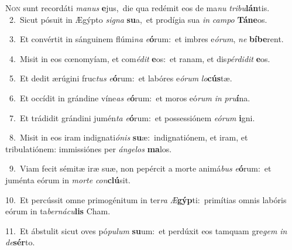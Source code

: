 \lettrine{\initial\textcolor{\initialcolor}{N}}{on} sunt recordáti \textit{ma}\-\textit{nus} \textbf{e}\-jus,~\star die qua redémit eos de ma\textit{nu} \textit{tri}\-\textit{bu}\textbf{lán}tis.\\
{\numbfont\textcolor{\numbcolor}{~2.}}~Sicut pósuit in Ægýpto \textit{si}\-\textit{gna} \textbf{su}\-a,~\star et prodígia sua \textit{in} \textit{cam}\-\textit{po} \textbf{Tá}\-\textbf{ne}os.\par
{\numbfont\textcolor{\numbcolor}{~3.}}~Et convértit in sánguinem flúmi\textit{na} \textit{e}\-\textbf{ó}rum:~\star et imbres e\-\textit{ó}\-\textit{rum}, \textit{ne} \textbf{bí}\-\textbf{be}rent.\par
{\numbfont\textcolor{\numbcolor}{~4.}}~Misit in eos cœnomyíam, et com\-\textit{é}\-\textit{dit} \textbf{e}\-os:~\star et ranam, et dis\-\textit{pér}\-\textit{di}\textit{dit} \textbf{e}\-os.\par
{\numbfont\textcolor{\numbcolor}{~5.}}~Et dedit ærúgini fruc\textit{tus} \textit{e}\-\textbf{ó}rum:~\star et labóres e\-\textit{ó}\-\textit{rum} \textit{lo}\-\textbf{cús}tæ.\par
{\numbfont\textcolor{\numbcolor}{~6.}}~Et occídit in grándine víne\textit{as} \textit{e}\-\textbf{ó}rum:~\star et moros eó\textit{rum} \textit{in} \textit{pru}\-\textbf{í}na.\par
{\numbfont\textcolor{\numbcolor}{~7.}}~Et trádidit grándini jumén\textit{ta} \textit{e}\-\textbf{ó}rum:~\star et possessiónem \textit{e}\-\textit{ó}\textit{rum} \textbf{i}\-gni.\par
{\numbfont\textcolor{\numbcolor}{~8.}}~Misit in eos iram indignati\-\textit{ó}\-\textit{nis} \textbf{su}\-æ:~\star indignatiónem, et iram, et tribulatiónem: immissiónes per \textit{án}\-\textit{ge}\textit{los} \textbf{ma}\-los.\par
{\numbfont\textcolor{\numbcolor}{~9.}}~Viam fecit sémitæ iræ suæ, non pepércit a morte animá\textit{bus} \textit{e}\-\textbf{ó}rum:~\star et juménta eórum in \textit{mor}\-\textit{te} \textit{con}\-\textbf{clú}sit.\par
{\numbfont\textcolor{\numbcolor}{10.}}~Et percússit omne primogénitum in ter\textit{ra} \textit{Æ}\-\textbf{gýp}ti:~\star primítias omnis labóris eórum in ta\-\textit{ber}\-\textit{ná}\textit{cu}\textbf{lis} Cham.\par
{\numbfont\textcolor{\numbcolor}{11.}}~Et ábstulit sicut oves pó\-\textit{pu}\-\textit{lum} \textbf{su}\-um:~\star et perdúxit eos tamquam gre\textit{gem} \textit{in} \textit{de}\-\textbf{sér}to.\par
